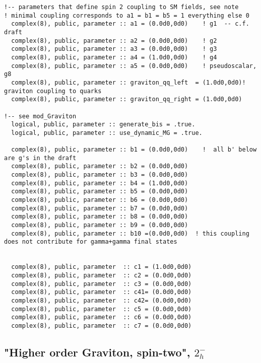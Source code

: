 \documentclass[aps,superscriptaddress,nofootinbib]{revtex4}
\begin{document}
\footnotesize
\begin{verbatim}
!-- parameters that define spin 2 coupling to SM fields, see note
! minimal coupling corresponds to a1 = b1 = b5 = 1 everything else 0
  complex(8), public, parameter :: a1 = (0.0d0,0d0)    ! g1  -- c.f. draft
  complex(8), public, parameter :: a2 = (0.0d0,0d0)    ! g2
  complex(8), public, parameter :: a3 = (0.0d0,0d0)    ! g3
  complex(8), public, parameter :: a4 = (1.0d0,0d0)    ! g4
  complex(8), public, parameter :: a5 = (0.0d0,0d0)    ! pseudoscalar, g8
  complex(8), public, parameter :: graviton_qq_left  = (1.0d0,0d0)! graviton coupling to quarks
  complex(8), public, parameter :: graviton_qq_right = (1.0d0,0d0)

!-- see mod_Graviton
  logical, public, parameter :: generate_bis = .true.
  logical, public, parameter :: use_dynamic_MG = .true.

  complex(8), public, parameter :: b1 = (0.0d0,0d0)    !  all b' below are g's in the draft
  complex(8), public, parameter :: b2 = (0.0d0,0d0)
  complex(8), public, parameter :: b3 = (0.0d0,0d0)
  complex(8), public, parameter :: b4 = (1.0d0,0d0)
  complex(8), public, parameter :: b5 = (0.0d0,0d0)
  complex(8), public, parameter :: b6 = (0.0d0,0d0)
  complex(8), public, parameter :: b7 = (0.0d0,0d0)
  complex(8), public, parameter :: b8 = (0.0d0,0d0)
  complex(8), public, parameter :: b9 = (0.0d0,0d0)
  complex(8), public, parameter :: b10 =(0.0d0,0d0)  ! this coupling does not contribute for gamma+gamma final states


  complex(8), public, parameter  :: c1 = (1.0d0,0d0)
  complex(8), public, parameter  :: c2 = (0.0d0,0d0)
  complex(8), public, parameter  :: c3 = (0.0d0,0d0)
  complex(8), public, parameter  :: c41= (0.0d0,0d0)
  complex(8), public, parameter  :: c42= (0.0d0,0d0)
  complex(8), public, parameter  :: c5 = (0.0d0,0d0)
  complex(8), public, parameter  :: c6 = (0.0d0,0d0)
  complex(8), public, parameter  :: c7 = (0.0d0,0d0)
\end{verbatim}
\normalsize

\subsection{"Higher order Graviton, spin-two", $2^-_h$}
\end{document}
